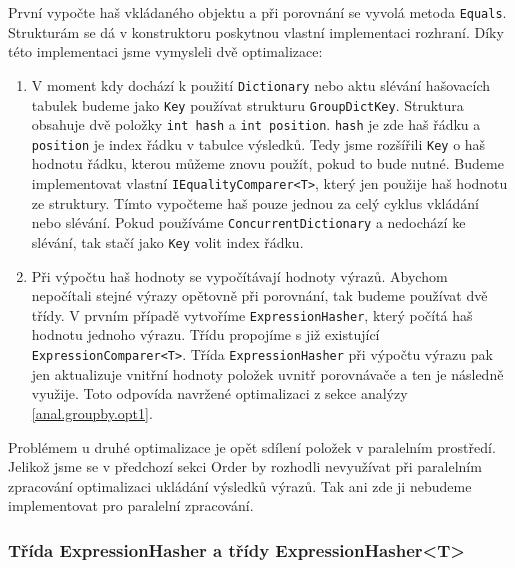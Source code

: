 První vypočte haš vkládaného objektu a při porovnání se vyvolá metoda \texttt{Equals}.
Strukturám se dá v konstruktoru poskytnou vlastní implementaci rozhraní.
Díky této implementaci jsme vymysleli dvě optimalizace:
\begin{enumerate}
\item V moment kdy dochází k použití \texttt{Dictionary} nebo aktu slévání hašovacích tabulek budeme jako \texttt{Key} používat strukturu \texttt{GroupDictKey}.
Struktura obsahuje dvě položky \texttt{int hash} a \texttt{int position}. 
\texttt{hash} je zde haš řádku a \texttt{position} je index řádku v tabulce výsledků.
Tedy jsme rozšířili \texttt{Key} o haš hodnotu řádku, kterou můžeme znovu použít, pokud to bude nutné.
Budeme implementovat vlastní \texttt{IEqualityComparer<T>}, který jen použije haš hodnotu ze struktury.
Tímto vypočteme haš pouze jednou za celý cyklus vkládání nebo slévání.
Pokud používáme \texttt{ConcurrentDictionary} a nedochází ke slévání, tak stačí jako \texttt{Key} volit index řádku.
\item Při výpočtu haš hodnoty se vypočítávají hodnoty výrazů.
Abychom nepočítali stejné výrazy opětovně při porovnání, tak budeme používat dvě třídy.
V prvním případě vytvoříme \texttt{ExpressionHasher}, který počítá haš hodnotu jednoho výrazu.
Třídu propojíme s již existující \texttt{ExpressionComparer<T>}.
Třída \texttt{ExpressionHasher} při výpočtu výrazu pak jen aktualizuje vnitřní hodnoty položek uvnitř porovnávače a ten je následně využije.
Toto odpovída navržené optimalizaci z sekce analýzy \ref{anal.groupby.opt1}.
\end{enumerate}
Problémem u druhé optimalizace je opět sdílení položek v paralelním prostředí.
Jelikož jsme se v předchozí sekci Order by rozhodli nevyužívat při paralelním zpracování optimalizaci ukládání výsledků výrazů.
Tak ani zde ji nebudeme implementovat pro paralelní zpracování. 

\subsubsection{Třída ExpressionHasher a třídy ExpressionHasher<T>}

